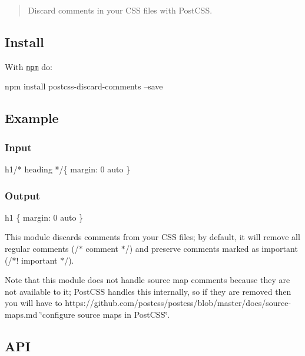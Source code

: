 \begin{quote}
Discard comments in your C\+SS files with Post\+C\+SS. \end{quote}


\subsection*{Install}

With \href{https://npmjs.org/package/postcss-discard-comments}{\tt npm} do\+:


\begin{DoxyCode}
npm install postcss-discard-comments --save
\end{DoxyCode}


\subsection*{Example}

\subsubsection*{Input}


\begin{DoxyCode}
h1/* heading */\{
    margin: 0 auto
\}
\end{DoxyCode}


\subsubsection*{Output}


\begin{DoxyCode}
h1 \{
    margin: 0 auto
\}
\end{DoxyCode}


This module discards comments from your C\+SS files; by default, it will remove all regular comments ({\ttfamily /$\ast$ comment $\ast$/}) and preserve comments marked as important ({\ttfamily /$\ast$! important $\ast$/}).

Note that this module does not handle source map comments because they are not available to it; Post\+C\+SS handles this internally, so if they are removed then you will have to https\+://github.com/postcss/postcss/blob/master/docs/source-\/maps.\+md \char`\"{}configure source maps in Post\+C\+S\+S\char`\"{}.

\subsection*{A\+PI}

